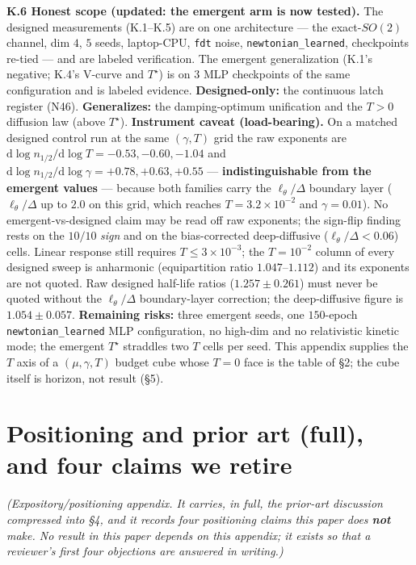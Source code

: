 \documentclass[10pt]{article}
\begin{document}
\textbf{K.6 Honest scope (updated: the emergent arm is now tested).} The designed measurements (K.1--K.5) are on one architecture --- the exact-$SO(2)$ channel, dim $4$, $5$ seeds, laptop-CPU, \texttt{fdt} noise, \texttt{newtonian\_learned}, checkpoints re-tied --- and are labeled verification. The emergent generalization (K.1's negative; K.4's V-curve and $T^\star$) is on $3$ MLP checkpoints of the same configuration and is labeled evidence. \textbf{Designed-only:} the continuous latch register (N46). \textbf{Generalizes:} the damping-optimum unification and the $T>0$ diffusion law (above $T^\star$). \textbf{Instrument caveat (load-bearing).} On a matched designed control run at the same $(\gamma,T)$ grid the raw exponents are $\mathrm{d}\log n_{1/2}/\mathrm{d}\log T=-0.53,-0.60,-1.04$ and $\mathrm{d}\log n_{1/2}/\mathrm{d}\log\gamma=+0.78,+0.63,+0.55$ --- \textbf{indistinguishable from the emergent values} --- because both families carry the $\ell_\theta/\Delta$ boundary layer ($\ell_\theta/\Delta$ up to $2.0$ on this grid, which reaches $T=3.2{\times}10^{-2}$ and $\gamma=0.01$). No emergent-vs-designed claim may be read off raw exponents; the sign-flip finding rests on the $10/10$ \emph{sign} and on the bias-corrected deep-diffusive ($\ell_\theta/\Delta<0.06$) cells. Linear response still requires $T\le3{\times}10^{-3}$; the $T{=}10^{-2}$ column of every designed sweep is anharmonic (equipartition ratio $1.047$--$1.112$) and its exponents are not quoted. Raw designed half-life ratios ($1.257\pm0.261$) must never be quoted without the $\ell_\theta/\Delta$ boundary-layer correction; the deep-diffusive figure is $1.054\pm0.057$. \textbf{Remaining risks:} three emergent seeds, one $150$-epoch \texttt{newtonian\_learned} MLP configuration, no high-dim and no relativistic kinetic mode; the emergent $T^\star$ straddles two $T$ cells per seed. This appendix supplies the $T$ axis of a $(\mu,\gamma,T)$ budget cube whose $T=0$ face is the table of \S2; the cube itself is horizon, not result (\S5).

\section{Positioning and prior art (full), and four claims we retire}

\emph{(Expository/positioning appendix. It carries, in full, the prior-art discussion compressed into \S4, and it records four positioning claims this paper does \textbf{not} make. No result in this paper depends on this appendix; it exists so that a reviewer's first four objections are answered in writing.)}
\end{document}

